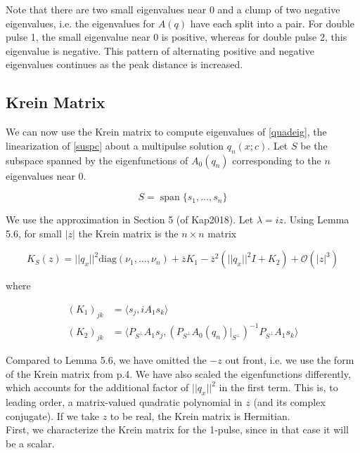\documentclass[12pt]{article}
\DeclareMathOperator{\spn}{span}
\begin{document}
Note that there are two small eigenvalues near 0 and a clump of two negative eigenvalues, i.e. the eigenvalues for $A(q)$ have each split into a pair. For double pulse 1, the small eigenvalue near 0 is positive, whereas for double pulse 2, this eigenvalue is negative. This pattern of alternating positive and negative eigenvalues continues as the peak distance is increased.

\subsection{Krein Matrix}

We can now use the Krein matrix to compute eigenvalues of \eqref{quadeig}, the linearization of \eqref{suspc} about a multipulse solution $q_n(x; c)$. Let $S$ be the subspace spanned by the eigenfunctions of $A_0(q_n)$ corresponding to the $n$ eigenvalues near 0.

\begin{equation}\label{defS}
S = \spn\{s_1, \dots, s_n \}
\end{equation}

We use the approximation in Section 5 (of Kap2018). Let $\lambda = i z$. Using Lemma 5.6, for small $|z|$ the Krein matrix is the $n \times n$ matrix

\begin{equation}\label{Kreinform}
K_S(z) = ||q_x||^2 \text{diag}(\nu_1, \dots, \nu_n) + \overline{z} K_1 
- \overline{z}^2 ( ||q_x||^2 I + K_2) + \mathcal{O}(|z|^3)
\end{equation}

where

\begin{align}
(K_1)_{jk} &= \langle s_j, i A_1 s_k \rangle \\
(K_2)_{jk} &= \langle P_{S^\perp} A_1 s_j, (P_{S^\perp} A_0(q_n)|_{S^\perp})^{-1} P_{S^\perp} A_1 s_k \rangle
\end{align}

Compared to Lemma 5.6, we have omitted the $-z$ out front, i.e. we use the form of the Krein matrix from p.4. We have also scaled the eigenfunctions differently, which accounts for the additional factor of $||q_x||^2$ in the first term. This is, to leading order, a matrix-valued quadratic polynomial in $z$ (and its complex conjugate). If we take $z$ to be real, the Krein matrix is Hermitian.\\

First, we characterize the Krein matrix for the 1-pulse, since in that case it will be a scalar.
\end{document}
